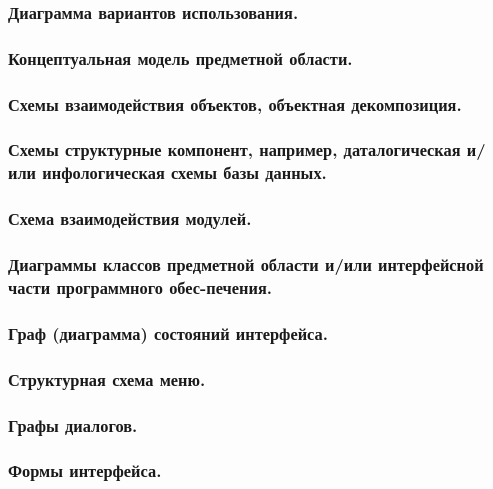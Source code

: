 \documentclass[12pt, left=30mm, right=15mm, top=20mm, bottom=20mm]{templateReportBMSTU}
\begin{document}
	\subsubsection{\textbf{Диаграмма вариантов использования.}}

	\subsubsection{\textbf{Концептуальная модель предметной области.}}

	\subsubsection{\textbf{Схемы взаимодействия объектов, объектная декомпозиция.}}
	
	\subsubsection{\textbf{Схемы структурные компонент, например, даталогическая и/или инфологическая схемы базы данных.}}

	\subsubsection{\textbf{Схема взаимодействия модулей.}}

	\subsubsection{\textbf{Диаграммы классов предметной области и/или интерфейсной части программного обес-печения.}}

	\subsubsection{\textbf{Граф (диаграмма) состояний интерфейса.}}

	\subsubsection{\textbf{Структурная схема меню.}}

	\subsubsection{\textbf{Графы диалогов.}}
	\hfill
	\subsubsection{\textbf{Формы интерфейса.}}
\end{document}
